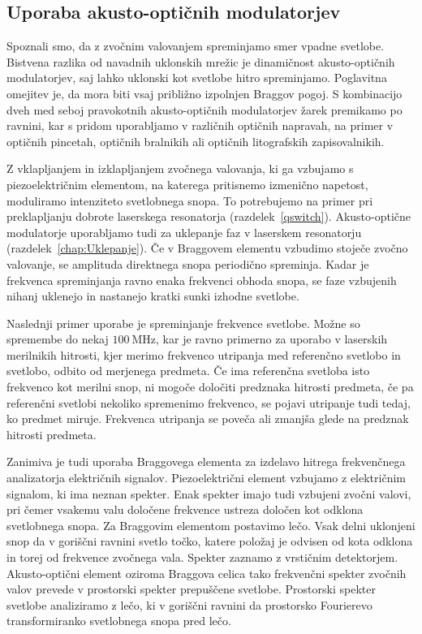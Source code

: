 \subsection*{Uporaba akusto-optičnih modulatorjev}
Spoznali smo, da z zvočnim valovanjem spreminjamo smer vpadne svetlobe.
Bistvena razlika od navadnih uklonskih mrežic je dinamičnost akusto-optičnih modulatorjev, 
saj lahko uklonski kot svetlobe hitro spreminjamo. Poglavitna omejitev je,
da mora biti vsaj približno izpolnjen Braggov pogoj. S kombinacijo dveh med seboj 
pravokotnih akusto-optičnih modulatorjev žarek 
premikamo po ravnini, kar s pridom uporabljamo v različnih optičnih napravah, 
na primer v optičnih pincetah, optičnih bralnikih ali 
optičnih litografskih zapisovalnikih.

Z vklapljanjem in izklapljanjem zvočnega valovanja, ki ga vzbujamo s piezoelektričnim 
elementom, na katerega pritisnemo izmenično napetost, moduliramo intenziteto
svetlobnega snopa. To potrebujemo na primer pri preklapljanju
dobrote laserskega resonatorja (razdelek~\ref{qswitch}).
Akusto-optične modulatorje uporabljamo tudi za uklepanje faz
v laserskem resonatorju (razdelek~\ref{chap:Uklepanje}). Če v Braggovem 
elementu vzbudimo stoječe zvočno valovanje, se amplituda direktnega snopa 
periodično spreminja. Kadar je frekvenca spreminjanja ravno enaka frekvenci
obhoda snopa, se faze vzbujenih nihanj uklenejo in nastanejo kratki
sunki izhodne svetlobe.

Naslednji primer uporabe je spreminjanje frekvence svetlobe. Možne so spremembe
do nekaj $100~\si{\mega\hertz}$, kar je ravno primerno za uporabo v laserskih merilnikih
hitrosti, kjer merimo frekvenco utripanja med referenčno svetlobo in svetlobo, odbito od
merjenega predmeta. Če ima referenčna svetloba
isto frekvenco kot merilni snop, ni mogoče določiti predznaka hitrosti
predmeta, če pa referenčni svetlobi nekoliko spremenimo frekvenco,
se pojavi utripanje tudi tedaj, ko predmet miruje. Frekvenca utripanja
se poveča ali zmanjša glede na predznak hitrosti predmeta.

Zanimiva je tudi uporaba Braggovega elementa za izdelavo
hitrega frekvenčnega analizatorja električnih signalov.  
Piezoelektrični element vzbujamo z električnim signalom,
ki ima neznan spekter. Enak spekter imajo tudi vzbujeni zvočni valovi, 
pri čemer vsakemu valu določene frekvence ustreza določen kot odklona svetlobnega
snopa. Za Braggovim elementom postavimo lečo. Vsak delni uklonjeni
snop da v goriščni ravnini svetlo točko, katere položaj je odvisen
od kota odklona in torej od frekvence zvočnega vala. Spekter zaznamo
z vrstičnim detektorjem. Akusto-optični element oziroma Braggova celica 
tako frekvenčni spekter zvočnih valov prevede v prostorski
spekter prepuščene svetlobe. Prostorski spekter svetlobe
analiziramo z lečo, ki v goriščni ravnini da prostorsko
Fourierevo transformiranko svetlobnega snopa pred lečo.

